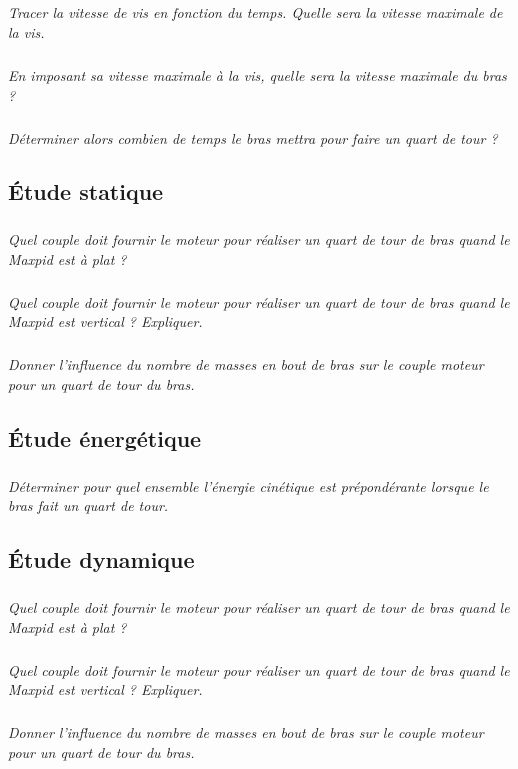 \documentclass[10pt,fleqn]{article} %
\begin{document}
\begin{multicols}{2}
\subparagraph{}\textit{Tracer la vitesse de vis en fonction du temps. Quelle sera la vitesse maximale de la vis.}

\subparagraph{}\textit{En imposant sa vitesse maximale à la vis, quelle sera la vitesse maximale du bras ?}

\subparagraph{}\textit{Déterminer alors combien de temps le bras mettra pour faire un quart de tour ?}


\subsection*{Étude statique}

\subparagraph{}\textit{Quel couple doit fournir le moteur pour réaliser un quart de tour de bras quand le Maxpid est à plat ?}

\subparagraph{}\textit{Quel couple doit fournir le moteur pour réaliser un quart de tour de bras quand le Maxpid est vertical ? Expliquer.}

\subparagraph{}\textit{Donner l'influence du nombre de masses en bout de bras sur le couple moteur pour un quart de tour du bras.}


\subsection*{Étude énergétique}

\subparagraph{}\textit{Déterminer pour quel ensemble l'énergie cinétique est prépondérante lorsque le bras fait un quart de tour.}


\subsection*{Étude dynamique}


\subparagraph{}\textit{Quel couple doit fournir le moteur pour réaliser un quart de tour de bras quand le Maxpid est à plat ?}

\subparagraph{}\textit{Quel couple doit fournir le moteur pour réaliser un quart de tour de bras quand le Maxpid est vertical ? Expliquer.}

\subparagraph{}\textit{Donner l'influence du nombre de masses en bout de bras sur le couple moteur pour un quart de tour du bras.}

\end{multicols}
\end{document}
